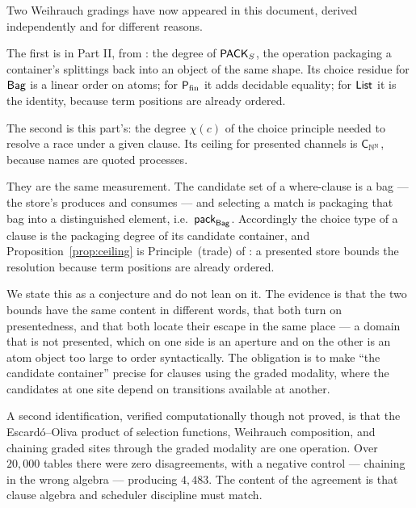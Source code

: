 Two Weihrauch gradings have now appeared in this document, derived independently
and for different reasons.

The first is in Part II, from \cite{Zeus}: the degree of $\mathsf{PACK}_{S}$, the
operation packaging a container's splittings back into an object of the same
shape. Its choice residue for $\mathsf{Bag}$ is a linear order on atoms; for $\mathsf{P}_{\mathrm{fin}}$ it
adds decidable equality; for $\mathsf{List}$ it is the identity, because term positions
are already ordered.

The second is this part's: the degree $\chi(c)$ of the choice principle needed to
resolve a race under a given clause. Its ceiling for presented channels is
$\mathsf{C}_{\mathbb{N}^{\mathbb{N}}}$, because names are quoted processes.

\begin{conjecture}
\label{conj:twogradings}
They are the same measurement. The candidate set of a where-clause is a bag ---
the store's produces and consumes --- and selecting a match is packaging that bag
into a distinguished element, i.e.\ $\mathsf{pack}_{\mathsf{Bag}}$. Accordingly the choice type of
a clause is the packaging degree of its candidate container, and
Proposition~\ref{prop:ceiling} is Principle~(trade) of \cite{Zeus}: a presented
store bounds the resolution because term positions are already ordered.
\end{conjecture}

We state this as a conjecture and do not lean on it. The evidence is that the two
bounds have the same content in different words, that both turn on presentedness,
and that both locate their escape in the same place --- a domain that is not
presented, which on one side is an aperture and on the other is an atom object too
large to order syntactically. The obligation is to make ``the candidate container''
precise for clauses using the graded modality, where the candidates at one site
depend on transitions available at another.

\begin{remark}
\label{rem:onethree}
A second identification, verified computationally though not proved, is that the
Escard\'o--Oliva product of selection functions, Weihrauch composition, and
chaining graded sites through the graded modality are one operation. Over
$20{,}000$ tables there were zero disagreements, with a negative control ---
chaining in the wrong algebra --- producing $4{,}483$. The content of the
agreement is that clause algebra and scheduler discipline must match.
\end{remark}

